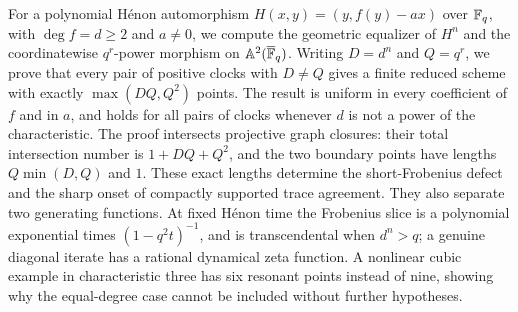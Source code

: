 For a polynomial H\'enon automorphism
$H(x,y)=(y,f(y)-ax)$ over $\mathbb F_q$, with $\deg f=d\geq2$ and $a\ne0$,
we compute the geometric equalizer of $H^n$ and the coordinatewise
$q^r$-power morphism on $\mathbb A^2(\overline{\mathbb F}_q)$.
Writing $D=d^n$ and $Q=q^r$, we prove that every pair of positive clocks
with $D\ne Q$ gives a finite reduced scheme with exactly
$\max(DQ,Q^2)$ points. The result is uniform in every coefficient of $f$
and in $a$, and holds for all pairs of clocks whenever $d$ is not a power
of the characteristic. The proof intersects projective graph closures:
their total intersection number is $1+DQ+Q^2$, and the two boundary points
have lengths $Q\min(D,Q)$ and $1$. These exact lengths determine the
short-Frobenius defect and the sharp onset of compactly supported trace
agreement. They also separate two generating functions. At fixed H\'enon
time the Frobenius slice is a polynomial exponential times
$(1-q^2t)^{-1}$, and is transcendental when $d^n>q$; a genuine diagonal
iterate has a rational dynamical zeta function. A nonlinear cubic example
in characteristic three has six resonant points instead of nine, showing
why the equal-degree case cannot be included without further hypotheses.
